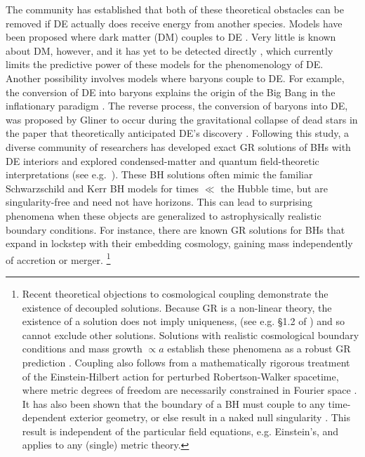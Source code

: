 \documentclass[a4paper,11pt]{article}
\begin{document}
The community has established that both of these theoretical obstacles can be removed if DE actually does receive energy from another species.
Models have been proposed where dark matter (DM) couples to DE \cite{Amendola2000, 2004ApJ...604....1F, PereiraJesus2009, CaiSu2010, PourtsidouSkordis2013, Yang:2018euj,Nunes:2022bhn}.  
Very little is known about DM, however, and it has yet to be detected directly \cite{2018PhRvD..98j2006A, 2021PhRvL.126u1803C, 2023PhRvL.131d1003A, 2023PhRvL.131d1002A, 2023PhRvD.107k2013A}, which currently limits the predictive power of these models for the phenomenology of DE.
Another possibility involves models where baryons couple to DE.
For example, the conversion of DE into baryons explains the origin of the Big Bang in the inflationary paradigm \cite{bassett06,2010ARNPS..60...27A}.
The reverse process, the conversion of baryons into DE, was proposed by Gliner to occur during the gravitational collapse of dead stars in the paper that theoretically anticipated DE's discovery \cite{Gliner66}.
Following this study, a diverse community of researchers has developed exact GR solutions of BHs with DE interiors \cite{BlauGuendelman1987, Dymnikova92,  VisserWiltshire04, Lobo06, mazur2015surface} and explored condensed-matter and quantum field-theoretic interpretations (see e.g.~\cite{Chapline01, 2004PNAS..101.9545M, MazurMottola23}).
These BH solutions often mimic the familiar Schwarzschild and Kerr BH models for times $\ll$ the Hubble time, but are singularity-free and need not have horizons.
This can lead to surprising phenomena when these objects are generalized to astrophysically realistic boundary conditions.
For instance, there are known GR solutions for BHs \citep[e.g.][]{FaraoniJacques07, Cadoni23a} that expand in lockstep with their embedding cosmology, gaining mass independently of accretion or merger.%
\footnote{Recent theoretical objections to cosmological coupling \cite{WangWang23, GuarVisser23, Avelino23, Dahal23a, Dahal23b} demonstrate the existence of decoupled solutions.
Because GR is a non-linear theory, the existence of a solution does not imply uniqueness, (see e.g. \S1.2 of \cite{BenderOrszag78}) and so cannot exclude other solutions.
Solutions with realistic cosmological boundary conditions and mass growth $\propto a$ establish these phenomena as a robust GR prediction \cite{Cadoni23a, Cadoni23b}.
Coupling also follows from a mathematically rigorous treatment of the Einstein-Hilbert action for perturbed Robertson-Walker spacetime, where metric degrees of freedom are necessarily constrained in Fourier space \cite{CrokerWeiner19, CrokerRunburg20, CrokerWeiner22}.
It has also been shown that the boundary of a BH must couple to any time-dependent exterior geometry, or else result in a naked null singularity \cite{FaraoniMassimiliano2024}.
This result is independent of the particular field equations, e.g. Einstein's, and applies to any (single) metric theory.}
\end{document}
